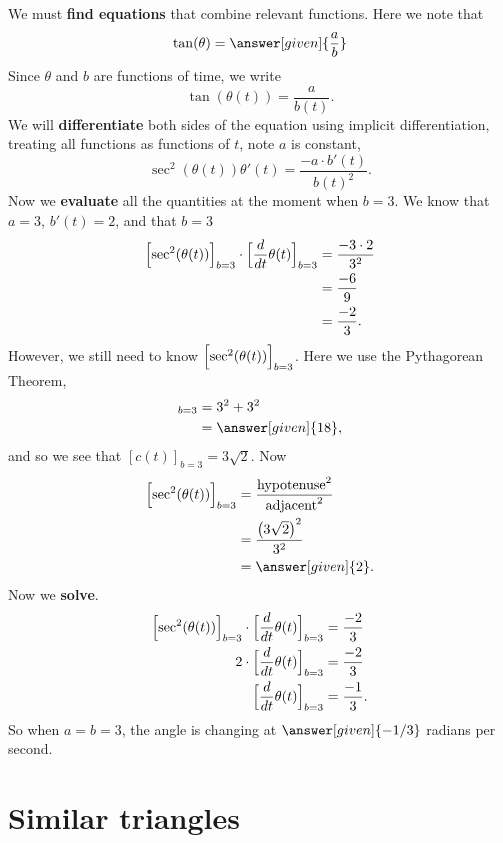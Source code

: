 \documentclass{ximera}
\begin{document}
\begin{example}
\begin{explanation}
    We must \textbf{find equations} that combine relevant
    functions. Here we note that
    \[
    \tan(\theta) = \answer[given]{\frac{a}{b}}
    \]
    Since $\theta$ and $b$ are functions of time, we write
    \[
    \tan(\theta(t)) = \frac{a}{b(t)}.
    \]
    We will \textbf{differentiate}  both sides of  the equation using
    implicit differentiation, treating all functions as functions of
    $t$, note $a$ is constant,
    \[
    \sec^2(\theta(t))\theta'(t) = \frac{-a\cdot b'(t)}{b(t)^2}.
    \]
    Now we \textbf{evaluate} all the quantities at the moment when $b=3$.  We
    know that $a=3$, $b'(t) = 2$, and that $b = 3$
    \begin{align*}
    \Bigl[\sec^2(\theta(t))\Bigr]_{b=3}\cdot \Bigl[\dfrac{d}{dt}\theta(t)\Bigr]_{b=3} &= \frac{-3\cdot 2}{3^2}\\
    &= \frac{-6}{9}\\
    &= \frac{-2}{3}.
    \end{align*}
    However, we still need to know $ \Bigl[\sec^2(\theta(t))\Bigr]_{b=3}$. Here we use the
    Pythagorean Theorem,
    \begin{align*}
    [c^2(t)]_{b=3} &= 3^2 + 3^2\\
    &=\answer[given]{18},
    \end{align*}
    and so we see that $[c(t)]_{b=3} = 3\sqrt{2}$. Now
    \begin{align*}
     \Bigl[\sec^2(\theta(t))\Bigr]_{b=3} &= \frac{\mathrm{hypotenuse}^2}{\mathrm{adjacent}^2}\\
      &= \frac{\left(3\sqrt{2}\right)^2}{3^2}\\
      &= \answer[given]{2}.
    \end{align*}
   Now we \textbf{solve}.
    \begin{align*}
    \Bigl[\sec^2(\theta(t))\Bigr]_{b=3}\cdot \Bigl[\dfrac{d}{dt}\theta(t)\Bigr]_{b=3}  &= \frac{-2}{3}\\
      2\cdot \Bigl[\dfrac{d}{dt}\theta(t)\Bigr]_{b=3}  &= \frac{-2}{3}\\
     \Bigl[\dfrac{d}{dt}\theta(t)\Bigr]_{b=3} &= \frac{-1}{3}.
    \end{align*}
    So when $a=b=3$, the angle is changing at $\answer[given]{-1/3}$
    radians per second.
  \end{explanation}
\end{example}



\section{Similar triangles}
\end{document}
